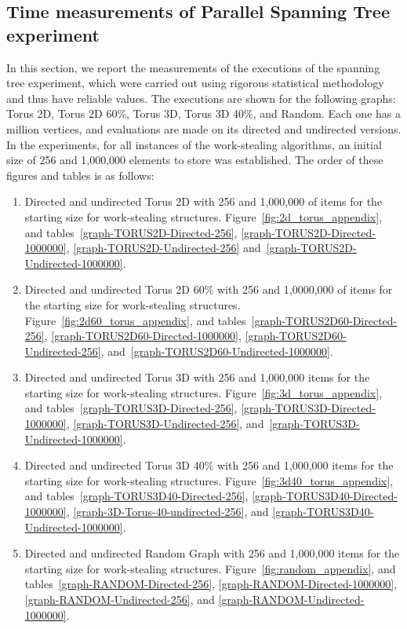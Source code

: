 \subsection{\label{subsec:measures}Time measurements of Parallel Spanning Tree experiment}

In this section, we report the measurements of the executions of the spanning tree experiment, which were carried out using rigorous statistical methodology and thus have reliable values. The executions are shown for the following graphs: Torus 2D, Torus 2D 60\%, Torus 3D, Torus 3D 40\%, and Random. Each one has a million vertices, and evaluations are made on its directed and undirected versions. In the experiments, for all instances of the work-stealing algorithms, an initial size of 256 and 1,000,000 elements to store was established. The order of these figures and tables is as follows:

\begin{enumerate}
    \item Directed and undirected Torus 2D with 256 and 1,000,000 of items for the starting size for work-stealing structures. Figure~\ref{fig:2d_torus_appendix}, and tables~\ref{graph-TORUS2D-Directed-256}, \ref{graph-TORUS2D-Directed-1000000}, \ref{graph-TORUS2D-Undirected-256} and~\ref{graph-TORUS2D-Undirected-1000000}.
    \item Directed and undirected Torus 2D 60\% with 256 and 1,0000,000 of items for the starting size for work-stealing structures. Figure~\ref{fig:2d60_torus_appendix}, and tables~\ref{graph-TORUS2D60-Directed-256}, \ref{graph-TORUS2D60-Directed-1000000}, \ref{graph-TORUS2D60-Undirected-256}, and~\ref{graph-TORUS2D60-Undirected-1000000}.
    \item Directed and undirected Torus 3D with 256 and 1,000,000 items for the starting size for work-stealing structures. Figure~\ref{fig:3d_torus_appendix}, and tables~\ref{graph-TORUS3D-Directed-256}, \ref{graph-TORUS3D-Directed-1000000}, \ref{graph-TORUS3D-Undirected-256}, and~\ref{graph-TORUS3D-Undirected-1000000}.
    \item Directed and undirected Torus 3D 40\% with 256 and 1,000,000 items for the starting size for work-stealing structures. Figure~\ref{fig:3d40_torus_appendix}, and tables~\ref{graph-TORUS3D40-Directed-256}, \ref{graph-TORUS3D40-Directed-1000000}, \ref{graph-3D-Torus-40-undirected-256}, and \ref{graph-TORUS3D40-Undirected-1000000}.
    \item Directed and undirected Random Graph with 256 and 1,000,000 items for the starting size for work-stealing structures. Figure~\ref{fig:random_appendix}, and tables~\ref{graph-RANDOM-Directed-256}, \ref{graph-RANDOM-Directed-1000000}, \ref{graph-RANDOM-Undirected-256}, and \ref{graph-RANDOM-Undirected-1000000}.
\end{enumerate}

